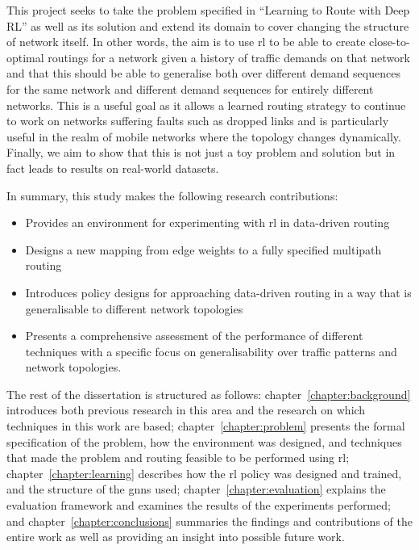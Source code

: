 This project seeks to take the problem specified in ``Learning to Route with Deep RL'' as well as its solution and extend its domain to cover changing the structure of network itself. In other words, the aim is to use \ac{rl} to be able to create close-to-optimal routings for a network given a history of traffic demands on that network and that this should be able to generalise both over different demand sequences for the same network and different demand sequences for entirely different networks. This is a useful goal as it allows a learned routing strategy to continue to work on networks suffering faults such as dropped links and is particularly useful in the realm of mobile networks where the topology changes dynamically. Finally, we aim to show that this is not just a toy problem and solution but in fact leads to results on real-world datasets.

In summary, this study makes the following research contributions:
\begin{itemize}
  \item Provides an environment for experimenting with \ac{rl} in data-driven routing
  \item Designs a new mapping from edge weights to a fully specified multipath routing
  \item Introduces policy designs for approaching data-driven routing in a way that is generalisable to different network topologies
  \item Presents a comprehensive assessment of the performance of different techniques with a specific focus on generalisability over traffic patterns and network topologies.
\end{itemize}

The rest of the dissertation is structured as follows: chapter~\ref{chapter:background} introduces both previous research in this area and the research on which techniques in this work are based; chapter~\ref{chapter:problem} presents the formal specification of the problem, how the environment was designed, and techniques that made the problem and routing feasible to be performed using \ac{rl}; chapter~\ref{chapter:learning} describes how the \ac{rl} policy was designed and trained, and the structure of the \acp{gnn} used; chapter~\ref{chapter:evaluation} explains the evaluation framework and examines the results of the experiments performed; and chapter~\ref{chapter:conclusions} summaries the findings and contributions of the entire work as well as providing an insight into possible future work.
